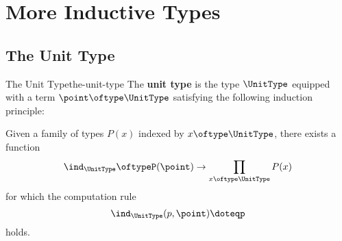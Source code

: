 \section{More Inductive Types}\label{section-more-inductive-types}
\subsection{The Unit Type}\label{subsection-the-unit-type}
\begin{definition}{The Unit Type}{the-unit-type}%
    The \textbf{unit type} is the type $\UnitType$ equipped with a term $\point\oftype\UnitType$ satisfying the following induction principle:
    \begin{itemize}
        \itemstar Given a family of types $P(x)$ indexed by $x\oftype\UnitType$, there exists a function
            \[
                \ind_{\UnitType}%
                \oftype%
                P(\point)%
                \to%
                \prod_{x\oftype\UnitType}P(x)%
            \]%
            for which the computation rule
            \[
                \ind_{\UnitType}(p,\point)%
                \doteq%
                p%
            \]%
            holds.
    \end{itemize}
\end{definition}
